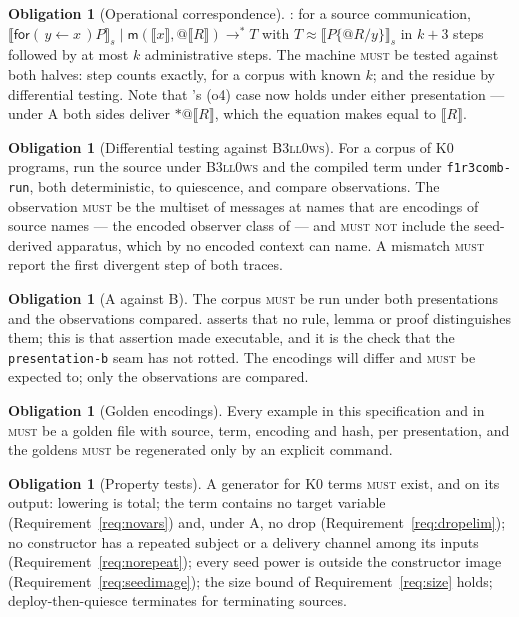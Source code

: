 \documentclass[11pt,a4paper]{article}
\makeatletter
\newcommand{\code}[1]{\texttt{#1}}
\newcommand{\Bell}{\textsc{B3ll0ws}}
\newcommand{\MUST}{\textsc{must}}
\newcommand{\MUSTNOT}{\textsc{must not}}
\newcommand{\quo}[1]{@#1}
\newcommand{\drp}[1]{{*}#1}
\newcommand{\inp}[3]{\mathsf{for}(\,#1 \leftarrow #2\,)#3}
\newcommand{\enc}[1]{\llbracket #1 \rrbracket}
\newcommand{\bisim}{\approx}
\newcommand{\mm}{\mathsf{m}}
\newcommand{\wred}{\longrightarrow^{*}}
\theoremstyle{definition}
\newtheorem{obligation}[definition]{Obligation}
\theoremstyle{plain}
\makeatother
\begin{document}
\begin{obligation}[Operational correspondence]\label{obl:opcorr}
\cite[Lem.~7.7]{draft3}: for a source communication,
$\enc{\inp{y}{x}{P}}_{s} \mid \mm(\enc{x},\quo{\enc{R}}) \wred T$ with
$T \bisim \enc{P\{\quo{R}/y\}}_{s}$ in $k+3$ steps followed by at most $k$
administrative steps. The machine \MUST{} be tested against both halves: step
counts exactly, for a corpus with known $k$; and the residue by differential
testing. Note that \cite[Lem.~7.7]{draft3}'s (o4) case now holds under either
presentation --- under A both sides deliver $\drp{\quo{\enc{R}}}$, which the
equation makes equal to $\enc{R}$.
\end{obligation}

\begin{obligation}[Differential testing against \Bell]\label{obl:diff}
For a corpus of K0 programs, run the source under \Bell{} and the compiled
term under \code{f1r3comb-run}, both deterministic, to quiescence, and compare
observations. The observation \MUST{} be the multiset of messages at names
that are encodings of source names --- the encoded observer class of
\cite[Thm.~7.9]{draft3} --- and \MUSTNOT{} include the seed-derived apparatus,
which by \cite[Lem.~7.6]{draft3} no encoded context can name. A mismatch
\MUST{} report the first divergent step of both traces.
\end{obligation}

\begin{obligation}[A against B]\label{obl:AB}
The corpus \MUST{} be run under both presentations and the observations
compared. \cite[Def.~3.3]{draft3} asserts that no rule, lemma or proof
distinguishes them; this is that assertion made executable, and it is the
check that the \code{presentation-b} seam has not rotted. The encodings will
differ and \MUST{} be expected to; only the observations are compared.
\end{obligation}

\begin{obligation}[Golden encodings]\label{obl:goldenenc}
Every example in this specification and in \cite[\S6]{draft3} \MUST{} be a
golden file with source, term, encoding and hash, per presentation, and the
goldens \MUST{} be regenerated only by an explicit command.
\end{obligation}

\begin{obligation}[Property tests]\label{obl:prop}
A generator for K0 terms \MUST{} exist, and on its output: lowering is total;
the term contains no target variable (Requirement~\ref{req:novars}) and, under
A, no drop (Requirement~\ref{req:dropelim}); no constructor has a repeated
subject or a delivery channel among its inputs
(Requirement~\ref{req:norepeat}); every seed power is outside the constructor
image (Requirement~\ref{req:seedimage}); the size bound of
Requirement~\ref{req:size} holds; deploy-then-quiesce terminates for
terminating sources.
\end{obligation}
\end{document}

